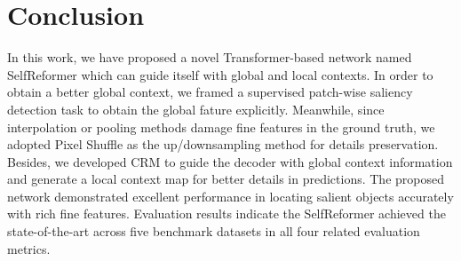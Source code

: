 \documentclass[letterpaper]{article} \usepackage{aaai22}  \usepackage{times}  \usepackage{helvet}  \usepackage{courier}  \usepackage[hyphens]{url}  \usepackage{graphicx} \urlstyle{rm} \def\UrlFont{\rm}  \usepackage{natbib}  \usepackage{caption} \DeclareCaptionStyle{ruled}{labelfont=normalfont,labelsep=colon,strut=off} \frenchspacing  \setlength{\pdfpagewidth}{8.5in}  \setlength{\pdfpageheight}{11in}  \usepackage{algorithm}
\begin{document}
\section{Conclusion}
In this work, we have proposed a novel Transformer-based network named SelfReformer which can guide itself with global and local contexts. In order to obtain a better global context, we framed a supervised patch-wise saliency detection task to obtain the global fature explicitly. Meanwhile, since interpolation or pooling methods damage fine features in the ground truth, we adopted Pixel Shuffle as the up/downsampling method for details preservation. Besides, we developed CRM to guide the decoder with global context information and generate a local context map for better details in predictions. The proposed network demonstrated excellent performance in locating salient objects accurately with rich fine features. Evaluation results indicate the SelfReformer achieved the state-of-the-art across five benchmark datasets in all four related evaluation metrics.





\end{document}
